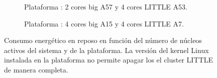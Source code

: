 \begin{figure}
  \centering
  \begin{subfigure}{0.9\textwidth}
    \centering
    \caption{Plataforma \juno: 2 cores big A57 y 4 cores LITTLE A53.}
      \label{}
    \end{subfigure}

    \vspace{0.5cm}

    \begin{subfigure}{0.9\textwidth}
      \centering
      \setlength{\fboxsep}{20pt} %
      \caption{Plataforma \odroid: 4 cores big A15 y 4 cores LITTLE A7.}
      \label{}
    \end{subfigure}  
    
  \caption[Consumo energético en función del número de cores activos en
  cada cluster]{Consumo energético en reposo en función del número de núcleos
    activos del sistema y de la plataforma. La versión del kernel Linux
    instalada en la plataforma \odroid no permite apagar los el cluster
    LITTLE de manera completa.}
  \label{s5:fig:apagadoCores}
\end{figure}


